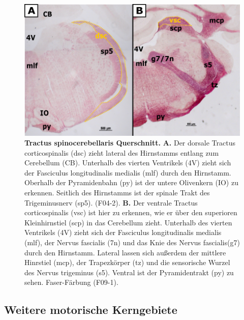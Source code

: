 \documentclass[12pt,a4paper,pdftex]{article}
\begin{document}
\begin{figure}[H]
    \centering
    \includegraphics[width=\textwidth]{pictures/Bilder_Laura/spinocerebellar_tract_F04_2P_025x_F09_1P_025x.png}
    \caption[Tractus spinocerebellaris Querschnitt]{\textbf{Tractus spinocerebellaris Querschnitt.} \textbf{A.} Der dorsale Tractus corticospinalis (dsc) zieht lateral des Hirnstamms entlang zum Cerebellum (CB). Unterhalb des vierten Ventrikels (4V) zieht sich der Fasciculus longitudinalis medialis (mlf) durch den Hirnstamm. Oberhalb der Pyramidenbahn (py) ist der untere Olivenkern (IO) zu erkennen. Seitlich des Hirnstamms ist der spinale Trakt des Trigeminusnerv (sp5). (F04-2). \textbf{B.} Der ventrale Tractus corticospinalis (vsc) ist hier zu erkennen, wie er über den superioren Kleinhirnstiel (scp) in das Cerebellum zieht.  Unterhalb des vierten Ventrikels (4V) zieht sich der Fasciculus longitudinalis medialis (mlf), der Nervus fascialis (7n) und das Knie des Nervus fascialis(g7) durch den Hirnstamm. Lateral lassen sich außerdem der mittlere Hinrstiel (mcp), der Trapezkörper (tz) und die sensorische Wurzel des Nervus trigeminus (s5). Ventral ist der Pyramidentrakt (py) zu sehen. Faser-Färbung (F09-1).}
    \label{fig:spinocerebellar}
\end{figure}

\subsection{Weitere motorische Kerngebiete}
\end{document}
